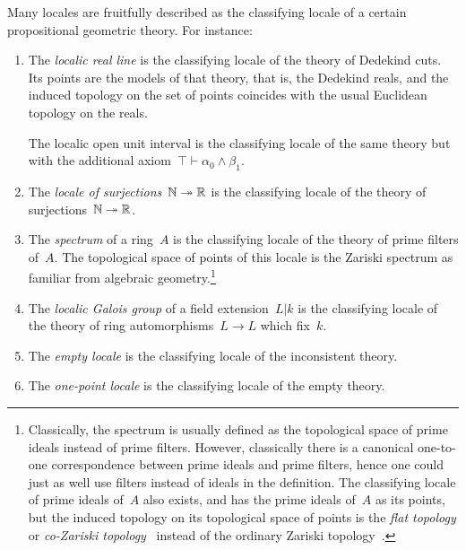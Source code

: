 \documentclass{ws-rv9x6}
\begin{document}
{Many locales are fruitfully described as the classifying locale of a certain
propositional geometric theory. For instance:
\begin{enumerate}
\item The \emph{localic real line} is the classifying locale of the theory of
Dedekind cuts. Its points are the models of that theory, that is, the Dedekind
reals, and the induced topology on the set of points coincides with the usual
Euclidean topology on the reals.

The localic open unit interval is the classifying locale of the
same theory but with the additional axiom~$\top \vdash \alpha_0 \wedge \beta_1$.
\item The \emph{locale of surjections~$\mathbb{N} \twoheadrightarrow \mathbb{R}$} is the
classifying locale of the theory of surjections~$\mathbb{N} \twoheadrightarrow \mathbb{R}$.
\item The \emph{spectrum} of a ring~$A$ is the classifying locale of the
theory of prime filters of~$A$. The topological space of points of this locale
is the Zariski spectrum as familiar from algebraic
geometry.\footnote{Classically, the spectrum is usually defined as the
topological space of prime ideals instead of prime filters. However,
classically there is a canonical one-to-one correspondence between prime ideals
and prime filters, hence one could just as well use filters instead of ideals
in the definition. The classifying locale of prime ideals of~$A$ also exists,
and has the prime ideals of~$A$ as its points, but the induced topology on its
topological space of points is the \emph{flat topology} or \emph{co-Zariski
topology}~\cite{tarizadeh:flat} instead of the ordinary
Zariski topology~\cite[Proposition~4.5]{johnstone:rings-fields-and-spectra}.}
\item The \emph{localic Galois group} of a field extension~$L|k$ is the
classifying locale of the theory of ring automorphisms~$L \to L$ which fix~$k$.
\item The \emph{empty locale} is the classifying locale of the inconsistent theory.
\item The \emph{one-point locale} is the classifying locale of the empty theory.
\end{enumerate}

}
\end{document}
